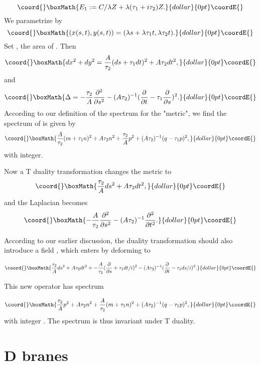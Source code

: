 \documentclass[a4paper,11pt]{amsart}
\begin{document}
$$\coord{}\boxMath{E_1:= C/\lambda Z + \lambda(\tau_1+i\tau_2) Z.}{dollar}{0pt}\coordE{}$$
We parametrize \coordHE{} by 
$$\coord{}\boxMath{(x(s,t),y(s,t)) = (\lambda s + \lambda \tau_1 t,\lambda \tau_2 t).}{dollar}{0pt}\coordE{}$$
Set \coordHE{}, the area of \coordHE{}. Then 
$$\coord{}\boxMath{dx^2 + dy^2 = \frac{A}{\tau_2}(ds+\tau_1dt)^2 + A\tau_2dt^2,}{dollar}{0pt}\coordE{}$$
and
$$\coord{}\boxMath{\Delta = -\frac{\tau_2}{A}\frac{\partial^2}{\partial s^2}
 - (A\tau_2)^{-1}(\frac{\partial}{\partial t} - \tau_1\frac{\partial}{\partial s})^2.
}{dollar}{0pt}\coordE{}$$
According to our definition of the spectrum for the "metric",
we find the spectrum of \coordHE{} is given by 
$$\coord{}\boxMath{\frac{A}{\tau_2}(m+\tau_1n)^2 + A\tau_2n^2 + \frac{\tau_2}{A}p^2
 + (A\tau_2)^{-1}(q - \tau_1p)^2,}{dollar}{0pt}\coordE{}$$
 with \coordHE{} integer.

Now a T duality transformation changes the metric to 
$$\coord{}\boxMath{\frac{\tau_2}{A}ds^2 + A\tau_2dt^2,}{dollar}{0pt}\coordE{}$$
and the Laplacian becomes 
$$\coord{}\boxMath{-\frac{A}{\tau_2}\frac{\partial^2}{\partial s^2}
 - (A\tau_2)^{-1}\frac{\partial^2}{\partial t^2}.}{dollar}{0pt}\coordE{}$$ 

According to our earlier discussion, the duality transformation should also 
introduce a \coordHE{} field \coordHE{}, which enters by deforming 
\coordHE{} to 

$$\coord{}\boxMath{\frac{\tau_2}{A}ds^2 + A\tau_2dt^2 + 
-\frac{A}{\tau_2}(\frac{\partial}{\partial s} + \tau_1 dt/i)^2
 - (A\tau_2)^{-1}(\frac{\partial}{\partial t} - \tau_1 ds/i)^2.}{dollar}{0pt}\coordE{}$$ 

This new operator has spectrum 

$$\coord{}\boxMath{\frac{\tau_2}{A}p^2 + A\tau_2n^2 + \frac{A}{\tau_2}(m+\tau_1 n)^2
 + (A\tau_2)^{-1}(q-\tau_1 p)^2,}{dollar}{0pt}\coordE{}$$
 with integer \coordHE{}.
 The spectrum is thus invariant under T duality.  
  

\section{D branes}  
\end{document}
